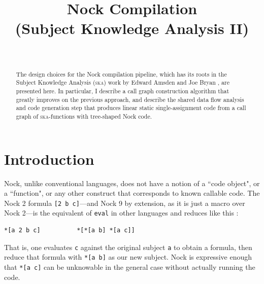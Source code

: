\documentclass[twoside]{article}
\title{Nock Compilation\\(Subject Knowledge Analysis II)}
\author{\authorname~\authorpatp \\ \affiliation}
\date{}
\begin{document}
\maketitle
\thispagestyle{firststyle}

\begin{abstract}
\sloppy
The design choices for the Nock compilation pipeline, which has its roots in the Subject Knowledge Analysis (\textsc{ska}) work by Edward Amsden  and Joe Bryan , are presented here. In particular, I describe a call graph construction algorithm that greatly improves on the previous approach, and describe the shared data flow analysis and code generation step that produces linear static single-assignment code from a call graph of \textsc{ska}-functions with tree-shaped Nock code.
\end{abstract}

\setcounter{page}{1}

\tableofcontents

\section{Introduction}

\sloppy
Nock, unlike conventional languages, does not have a notion of a ``code object", or a ``function", or any other construct that corresponds to known callable code.  The Nock 2 formula \texttt{[2 b c]}---and Nock 9 by extension, as it is just a macro over Nock 2---is the equivalent of \texttt{eval} in other languages and reduces like this \citep{nock4-spec}:

\begin{lstlisting}[style=listingblock]
*[a 2 b c]          *[*[a b] *[a c]]
\end{lstlisting}

\noindent
That is, one evaluates \texttt{c} against the original subject \texttt{a} to obtain a formula, then reduce that formula with \texttt{*[a b]} as our new subject. Nock is expressive enough that \texttt{*[a c]} can be unknowable in the general case without actually running the code.
\end{document}

